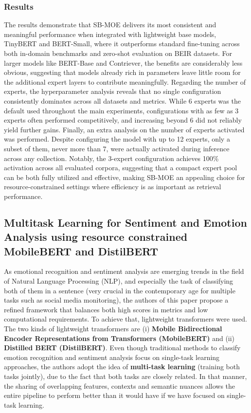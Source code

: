 \documentclass[a4paper,12pt]{article}
\begin{document}
\subsubsection{Results}
The results demonstrate that SB-MOE delivers its most consistent and meaningful performance when integrated with lightweight base models, TinyBERT and BERT-Small, where it outperforms standard fine-tuning across both in-domain benchmarks and zero-shot evaluation on BEIR datasets. For larger models like BERT-Base and Contriever, the benefits are considerably less obvious, suggesting that models already rich in parameters leave little room for the additional expert layers to contribute meaningfully. Regarding the number of experts, the hyperparameter analysis reveals that no single configuration consistently dominates across all datasets and metrics. While 6 experts was the default used throughout the main experiments, configurations with as few as 3 experts often performed competitively, and increasing beyond 6 did not reliably yield further gains. Finally, an extra analysis on the number of experts activated was performed. Despite configuring the model with up to 12 experts, only a subset of them, never more than 7, were actually activated during inference across any collection. Notably, the 3-expert configuration achieves 100\% activation across all evaluated corpora, suggesting that a compact expert pool can be both fully utilized and effective, making SB-MOE an appealing choice for resource-constrained settings where efficiency is as important as retrieval performance.

\subsection{Multitask Learning for Sentiment and Emotion Analysis using resource constrained MobileBERT and DistilBERT}

As emotional recognition and sentiment analysis are emerging trends in the field of Natural Language Processing (NLP), and especially the task of classifying both of them in a sentence (very crucial in the contemporary age for multiple tasks such as social media monitoring), the authors of this paper propose a refined framework that balances both high scores in metrics and low computational requirements.
To achieve that, lightweight transformers were used. The two kinds of lightweight transformers are (i) \textbf{Mobile Bidirectional Encoder Representations from Transformers (MobileBERT)} and (ii) \textbf{Distilled BERT (DistilBERT)}. Even though traditional methods to classify emotion recognition and sentiment analysis focus on single-task learning approaches, the authors adopt the idea of \textbf{multi-task learning} (training both tasks jointly),
due to the fact that both tasks are closely related. In that manner, the sharing of overlapping features, contexts and semantic nuances allows the entire pipeline to perform better than it would have if we have focused on single-task learning.
\end{document}
